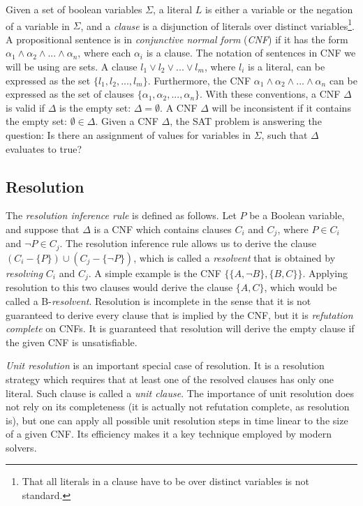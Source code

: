 \documentclass[12pt]{diicc}
\begin{document}
Given a set of boolean variables $\Sigma$, a literal $L$ is either a variable or the negation of a variable in $\Sigma$, and a \textit{clause} is a disjunction of literals over distinct variables\footnote[1]{That all literals in a clause have to be over distinct variables is not standard.}. A propositional sentence is in \textit{conjunctive normal form} (\textit{CNF}) if it has the form $\alpha_{1} \wedge \alpha_{2} \wedge ... \wedge \alpha_{n}$, where each $\alpha_{i}$ is a clause. The notation of sentences in CNF we will be using are sets. A clause $l_{1} \vee l_{2} \vee ... \vee l_{m}$, where $l_{i}$ is a literal, can be expressed as the set $\{l_{1},l_{2},...,l_{m}\}$. Furthermore, the CNF $\alpha_{1} \wedge \alpha_{2} \wedge ... \wedge \alpha_{n}$ can be expressed as the set of clauses $\{\alpha_{1},\alpha_{2},...,\alpha_{n}\}$. With these conventions, a CNF $\Delta$ is valid if $\Delta$ is the empty set: $\Delta = \emptyset$. A CNF $\Delta$ will be inconsistent if it contains the empty set: $\emptyset \in \Delta$. 
Given a CNF $\Delta$, the SAT problem is answering the question: Is there an assignment of values for variables in $\Sigma$, such that $\Delta$ evaluates to true?

\subsection{Resolution}
The \textit{resolution inference rule} \cite{Rob65} is defined as follows. Let $P$ be a Boolean variable, and suppose that $\Delta$ is a CNF which contains clauses $C_{i}$ and $C_{j}$, where $P \in C_{i}$ and $\neg P \in C_{j}$. The resolution inference rule allows us to derive the clause $(C_{i}-\{P\})\cup (C_{j}-\{\neg P\})$, which is called a \textit{resolvent} that is obtained by \textit{resolving} $C_{i}$ and $C_{j}$. A simple example is the CNF $\{\{A,\neg B\},\{B,C\}\}$. Applying resolution to this two clauses would derive the clause $\{A,C\}$, which would be called a B-\textit{resolvent}.
Resolution is incomplete in the sense that it is not guaranteed to derive every clause that is implied by the CNF, but it is \textit{refutation complete} on CNFs. It is guaranteed that resolution will derive the empty clause if the given CNF is unsatisfiable. 

\textit{Unit resolution} is an important special case of resolution. It is a resolution strategy which requires that at least one of the resolved clauses has only one literal. Such clause is called a \textit{unit clause}. The importance of unit resolution does not rely on its completeness (it is actually not refutation complete, as resolution is), but one can apply all possible unit resolution steps in time linear to the size of a given CNF. Its efficiency makes it a key technique employed by modern solvers.
\end{document}
